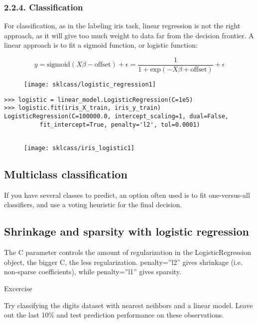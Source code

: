 \documentclass[SKL-MASTER.tex]{subfiles}
\begin{document}

\subsubsection{2.2.4. Classification}



For classification, as in the labeling iris task, linear regression is not the right approach, as it will give too much weight to data far from the decision frontier. A linear approach is to fit a sigmoid function, or logistic function:

\[y = \textrm{sigmoid}(X\beta - \textrm{offset}) + \epsilon =
\frac{1}{1 + \textrm{exp}(- X\beta + \textrm{offset})} + \epsilon\]

\begin{figure}[h!]
	\centering
	\texttt{[image: sklcass/logistic\_regression1]}
	\caption{}
	\label{fig:logistic_regression1}
\end{figure}

\begin{framed}
\begin{verbatim}
>>> logistic = linear_model.LogisticRegression(C=1e5)
>>> logistic.fit(iris_X_train, iris_y_train)
LogisticRegression(C=100000.0, intercept_scaling=1, dual=False,
          fit_intercept=True, penalty='l2', tol=0.0001)
 
\end{verbatim}
\end{framed}

\begin{figure}
\centering
\texttt{[image: sklcass/iris\_logistic1]}
\end{figure}

\newpage
\subsection{Multiclass classification}

If you have several classes to predict, an option often used is to fit one-versus-all classifiers, and use a voting heuristic for the final decision.

\subsection{Shrinkage and sparsity with logistic regression}

The C parameter controls the amount of regularization in the LogisticRegression object, the bigger C, the less regularization. penalty=”l2” gives shrinkage (i.e. non-sparse coefficients), while penalty=”l1” gives sparsity.

Excercise

Try classifying the digits dataset with nearest neihbors and a linear model. Leave out the last 10\% and test prediction performance on these observations.
\end{document}
